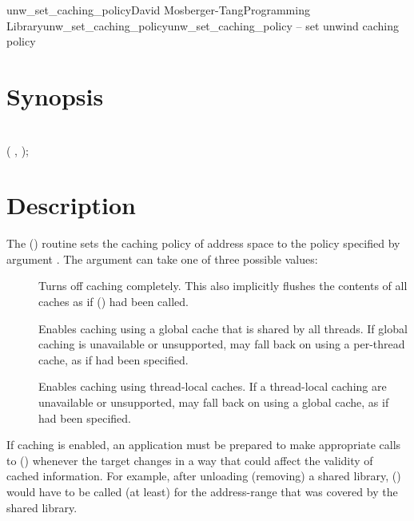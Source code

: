\documentclass{article}
\begin{document}
\begin{Name}{3}{unw\_set\_caching\_policy}{David Mosberger-Tang}{Programming Library}{unw\_set\_caching\_policy}unw\_set\_caching\_policy -- set unwind caching policy
\end{Name}

\section{Synopsis}

\\

 ( ,  );\\

\section{Description}

The () routine sets the caching policy
of address space  to the policy specified by argument
.  The  argument can take one of three
possible values:
\begin{description}
\item[] Turns off caching completely.  This
  also implicitly flushes the contents of all caches as if
  () had been called.
\item[] Enables caching using a global cache
  that is shared by all threads.  If global caching is unavailable or
  unsupported,  may fall back on using a per-thread
  cache, as if  had been specified.
\item[] Enables caching using
  thread-local caches.  If a thread-local caching are unavailable or
  unsupported,  may fall back on using a global cache,
  as if  had been specified.
\end{description}

If caching is enabled, an application must be prepared to make
appropriate calls to () whenever the target
changes in a way that could affect the validity of cached information.
For example, after unloading (removing) a shared library,
() would have to be called (at least) for the
address-range that was covered by the shared library.
\end{document}
